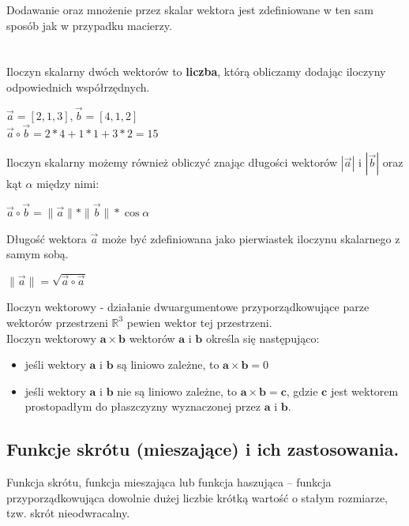 \documentclass[a4paper,12pt,oneside]{book}
\begin{document}
	Dodawanie oraz mnożenie przez skalar wektora jest zdefiniowane w ten sam sposób jak w przypadku macierzy. \\\\\\
	
	
	Iloczyn skalarny dwóch wektorów to \textbf{liczba}, którą obliczamy dodając iloczyny odpowiednich współrzędnych.
	
	\begin{center}
		$\vec{a}=[2,1,3], \vec{b}=[4,1,2]$\\
		$\vec{a}\circ\vec{b} = 2*4 + 1*1 + 3*2 = 15$
	\end{center}

	Iloczyn skalarny możemy również obliczyć znając długości wektorów $|\vec{a}|$ i $|\vec{b}|$ oraz kąt $\alpha$ między nimi:
	
	\begin{center}
		$\vec{a}\circ\vec{b}=\|\vec{a}\|*\|\vec{b}\|*\cos\alpha$
	\end{center}

	Długość wektora $\vec{a}$ może być zdefiniowana jako pierwiastek iloczynu skalarnego z samym sobą. 
	
	\begin{center}
		$\|\vec{a}\|=\sqrt{\vec{a}\circ\vec{a}}$
	\end{center}

Iloczyn wektorowy - działanie dwuargumentowe przyporządkowujące parze wektorów przestrzeni $\mathbb{R}^3$ pewien wektor tej przestrzeni.\\

Iloczyn wektorowy $\mathbf {a} \times \mathbf {b}$ wektorów $\mathbf a $ i $ \mathbf  b$ określa się następująco:
\begin{itemize}
	\item jeśli wektory $\mathbf{a}$ i $\mathbf{b}$ są liniowo zależne, to $\mathbf{a}\times\mathbf{b}=0$
	\item jeśli wektory $\mathbf{a}$ i $\mathbf{b}$ nie są liniowo zależne, to $\mathbf{a}\times\mathbf{b}=\mathbf{c}$, gdzie $\mathbf{c}$ jest wektorem prostopadłym do płaszczyzny wyznaczonej przez $\mathbf{a}$ i $\mathbf{b}$.
\end{itemize}

\subsection{Funkcje skrótu (mieszające) i ich zastosowania.}
Funkcja skrótu, funkcja mieszająca lub funkcja haszująca – funkcja przyporządkowująca dowolnie dużej liczbie krótką wartość o stałym rozmiarze, tzw. skrót nieodwracalny.\\
\end{document}
